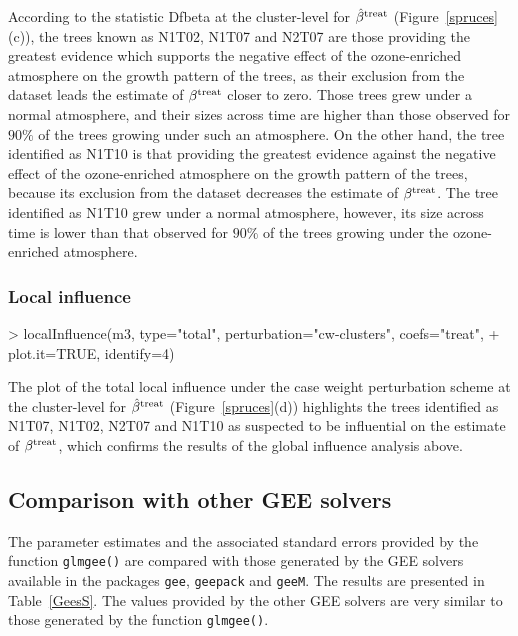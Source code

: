 According to the statistic Dfbeta at the cluster-level for $\hat{\beta}^{\rm treat}$ (Figure~\ref{spruces}(c)), the trees known as N1T02, N1T07 and N2T07 are those providing the greatest evidence which supports the negative effect of the ozone-enriched atmosphere on the growth pattern of the trees, as their exclusion from the dataset leads the estimate of $\beta^{\rm treat}$ closer to zero. Those trees grew under a normal atmosphere, and their sizes across time are higher than those observed for $90\%$ of the trees growing under such an atmosphere. On the other hand, the tree identified as N1T10 is that providing the greatest evidence against the negative effect of the ozone-enriched atmosphere on the growth pattern of the trees, because its exclusion from the dataset decreases the estimate of $\beta^{\rm treat}$. The tree identified as N1T10 grew under a normal atmosphere, however, its size across time is lower than that observed for $90\%$ of the trees growing under the ozone-enriched atmosphere.

\subsubsection{Local influence}
\begin{example}
> localInfluence(m3, type="total", perturbation="cw-clusters", coefs="treat", 
+                plot.it=TRUE, identify=4)
\end{example}

The plot of the total local influence under the case weight perturbation scheme at the cluster-level for $\hat{\beta}^{\rm treat}$ (Figure~\ref{spruces}(d)) highlights the trees identified as N1T07, N1T02, N2T07 and N1T10 as suspected to be influential on the estimate of $\beta^{\rm treat}$, which confirms the results of the global influence analysis above.

\subsection{Comparison with other GEE solvers}
The parameter estimates and the associated standard errors provided by the function {\tt glmgee()} are compared with those generated by the GEE solvers available in the packages {\tt gee}, {\tt geepack} and {\tt geeM}. The results are presented in Table~\ref{GeesS}. The values provided by the other GEE solvers are very similar to those generated by the function {\tt glmgee()}.

